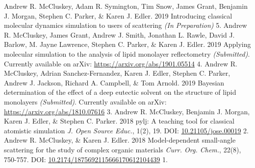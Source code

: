 \begin{cvpubys}
  \cvpuby
    {Andrew R. McCluskey, Adam R. Symington, Tim Snow, James Grant, Benjamin J. Morgan, Stephen C. Parker, \& Karen J. Edler.}
    {2019}
    {Introducing classical molecular dynamics simulation to users of scattering}
    {\emph{(In Preparation)}}
    {5.}
  \cvpuby
    {Andrew R. McCluskey, James Grant, Andrew J. Smith, Jonathan L. Rawle, David J. Barlow, M. Jayne Lawrence, Stephen C. Parker, \& Karen J. Edler.}
    {2019}
    {Applying molecular simulation to the analysis of lipid monolayer reflectometry}
    {\emph{(Submitted)}. Currently available on arXiv: \href{1901.05514}{https://arxiv.org/abs/1901.05514}}
    {4.}
  \cvpuby
    {Andrew R. McCluskey, Adrian Sanchez-Fernandez, Karen J. Edler, Stephen C. Parker, Andrew J. Jackson, Richard A. Campbell, \& Tom Arnold.}
    {2019}
    {Bayesian determination of the effect of a deep eutectic solvent on the structure of lipid monolayers}
    {\emph{(Submitted)}. Currently available on arXiv: \href{1810.07616}{https://arxiv.org/abs/1810.07616}}
    {3.}
  \cvpuby
    {Andrew R. McCluskey, Benjamin J. Morgan, Karen J. Edler, \& Stephen C. Parker.}
    {2018}
    {pylj: A teaching tool for classical atomistic simulation}
    {\emph{J. Open Source Educ.}, 1(2), 19. DOI: \href{http://doi.org/10.21105/jose.00019}{10.21105/jose.00019}}
    {2.}
  \cvpuby
    {Andrew R. McCluskey, \& Karen J. Edler.}
    {2018}
    {Model-dependent small-angle scattering for the study of complex organic materials}
    {\emph{Curr. Org. Chem.}, 22(8), 750-757. DOI: \href{http://doi.org/10.2174/1875692115666170612104439}{10.2174/1875692115666170612104439}}
    {1.}
\end{cvpubys}
